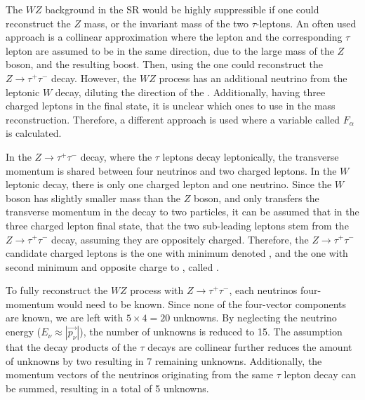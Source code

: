 The $WZ$ background in the \zdep{} SR would be highly suppressible if one could reconstruct the $Z$ mass, or the invariant mass of the two $\tau$-leptons. An often used approach is a collinear approximation where the lepton and the corresponding $\tau$ lepton are assumed to be in the same direction, due to the large mass of the $Z$ boson, and the resulting boost. Then, using the \met{} one could reconstruct the $Z \to \tau^{+}\tau^{-}$ decay. However, the $WZ$ process has an additional neutrino from the leptonic $W$ decay, diluting the direction of the \met{}. Additionally, having three charged leptons in the final state, it is unclear which ones to use in the mass reconstruction. Therefore, a different approach is used where a variable called $F_{\alpha}$ is calculated.

In the $Z \to \tau^{+}\tau^{-}$ decay, where the $\tau$ leptons decay leptonically, the transverse momentum is shared between four neutrinos and two charged leptons. In the $W$ leptonic decay, there is only one charged lepton and one neutrino. Since the $W$ boson has slightly smaller mass than the $Z$ boson, and only transfers the transverse momentum in the decay to two particles, it can be assumed that in the three charged lepton final state, that the two sub-leading leptons stem from the $Z \to \tau^{+}\tau^{-}$ decay, assuming they are oppositely charged. Therefore, the $Z \to \tau^{+}\tau^{-}$ candidate charged leptons is the one with minimum \pt{} denoted \lone{}, and the one with second minimum \pt{} and opposite charge to \lone{}, called \ltwo{}. 

To fully reconstruct the $WZ$ process with $Z \to \tau^{+}\tau^{-}$, each neutrinos four-momentum would need to be known. Since none of the four-vector components are known, we are left with $5 \times 4 = 20$ unknowns. By neglecting the neutrino energy ($E_{\nu} \approx |\vec{p_{\nu}}|$), the number of unknowns is reduced to 15. The assumption that the decay products of the $\tau$ decays are collinear further reduces the amount of unknowns by two resulting in 7 remaining unknowns. Additionally, the momentum vectors of the neutrinos originating from the same $\tau$ lepton decay can be summed, resulting in a total of 5 unknowns. 

